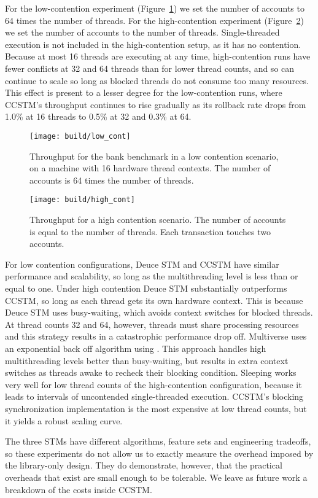 For the low-contention
experiment (Figure~\ref{fig:lowcont}) we set the number of accounts
to 64 times the number of threads.  For the high-contention experiment
(Figure~\ref{fig:highcont}) we set the number of accounts to the number of
threads.  Single-threaded execution is not included in the high-contention
setup, as it has no contention.  Because at most 16 threads are executing
at any time, high-contention runs have fewer conflicts at 32 and 64
threads than for lower thread counts, and so can continue to scale so long as
blocked threads do not consume too many resources.  This effect is present
to a lesser degree for the low-contention runs, where CCSTM's throughput
continues to rise gradually as its rollback rate
drops from 1.0\% at 16 threads to 0.5\% at 32 and 0.3\% at 64.

\begin{figure}
  \centering \texttt{[image: build/low\_cont]}

\caption{Throughput for the bank benchmark in a low contention scenario,
on a machine with 16 hardware thread contexts.  The number of accounts
is 64 times the number of threads.}

  \label{fig:lowcont}
\end{figure}

\begin{figure}
  \centering \texttt{[image: build/high\_cont]}

\caption{Throughput for a high contention scenario.  The number of accounts is
equal to the number of threads.  Each transaction touches two accounts.}

  \label{fig:highcont}
\end{figure}

For low contention configurations, Deuce STM and CCSTM have similar
performance and scalability, so long as the multithreading level is less
than or equal to one.  Under high contention Deuce STM substantially
outperforms CCSTM, so long as each thread gets its own hardware context.
This is because Deuce STM uses busy-waiting, which avoids context switches
for blocked threads.  At thread counts 32 and 64, however, threads must
share processing resources and this strategy results in a catastrophic
performance drop off.  Multiverse uses an exponential back off algorithm
using .  This approach handles high multithreading
levels better than busy-waiting, but results in extra context switches as
threads awake to recheck their blocking condition.  Sleeping works very well
for low thread counts
of the high-contention configuration, because
it leads to intervals of uncontended single-threaded execution.
CCSTM's blocking synchronization implementation is the most
expensive at low thread counts, but it yields a robust scaling curve.

The three STMs have different algorithms, feature sets and engineering
tradeoffs, so these experiments do not allow us to exactly measure
the overhead imposed by the library-only design.  They do demonstrate,
however, that the practical overheads that exist are small enough to be
tolerable.  We leave as future work a breakdown of the costs inside CCSTM.

